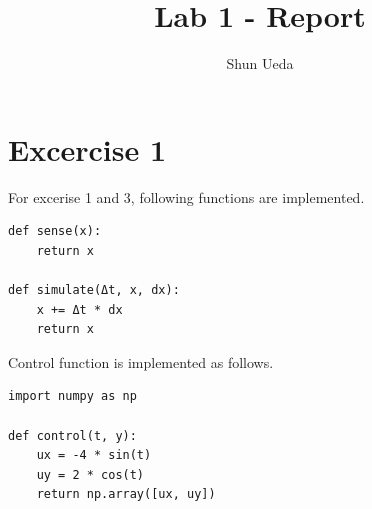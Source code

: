 \documentclass[letterpaper, 10 pt, conference]{ieeeconf}  %
\title{\LARGE \bf Lab 1 - Report}
\author{Shun Ueda}
\begin{document}
    \maketitle
    \thispagestyle{empty}
    \pagestyle{empty}


    \section{Excercise 1}
    For excerise 1 and 3, following functions are implemented.

    \begin{lstlisting}[label={lst:lstlisting}]
def sense(x):
    return x

def simulate(Δt, x, dx):
    x += Δt * dx
    return x
    \end{lstlisting}

    Control function is implemented as follows.

    \begin{lstlisting}[label={lst:lstlisting1}]
import numpy as np

def control(t, y):
    ux = -4 * sin(t)
    uy = 2 * cos(t)
    return np.array([ux, uy])
    \end{lstlisting}
\end{document}
